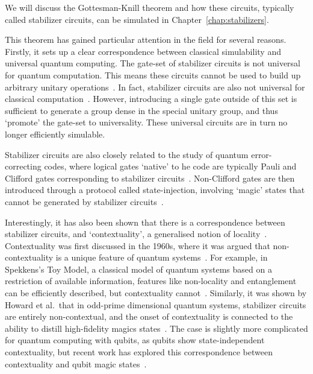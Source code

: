 We will discuss the Gottesman-Knill theorem and how these circuits, typically called stabilizer circuits, can be simulated in Chapter~\ref{chap:stabilizers}.\par
This theorem has gained particular attention in the field for several reasons. Firstly, it sets up a clear correspondence between classical simulability and universal quantum computing. The gate-set of stabilizer circuits is not universal for quantum computation. This means these circuits cannot be used to build up arbitrary unitary operations~\cite{Nielsen2000}. In fact, stabilizer circuits are also not universal for classical computation~\cite{Aaronson2004}. However, introducing a single gate outside of this set is sufficient to generate a group dense in the special unitary group, and thus `promote' the gate-set to universality. These universal circuits are in turn no longer efficiently simulable.\par
Stabilizer circuits are also closely related to the study of quantum error-correcting codes, where logical gates `native' to he code are typically Pauli and Clifford gates corresponding to stabilizer circuits~\cite{Nielsen2000}. Non-Clifford gates are then introduced through a protocol called state-injection, involving `magic' states that cannot be generated by stabilizer circuits~\cite{Gottesman1999,Bravyi2005}.\par
Interestingly, it has also been shown that there is a correspondence between stabilizer circuits, and `contextuality', a generalised notion of locality~\cite{Howard2014}. Contextuality was first discussed in the 1960s, where it was argued that non-contextuality is a unique feature of quantum systems~\cite{Bell1966,Kochen1967}. For example, in Spekkens's Toy Model, a classical model of quantum systems based on a restriction of available information, features like non-locality and entanglement can be efficiently described, but contextuality cannot~\cite{Kochen1967}. Similarly, it was shown by Howard et al.\ that in odd-prime dimensional quantum systems, stabilizer circuits are entirely non-contextual, and the onset of contextuality is connected to the ability to distill high-fidelity magics states~\cite{Howard2014}. The case is slightly more complicated for quantum computing with qubits, as qubits show state-independent contextuality, but recent work has explored this correspondence between contextuality and qubit magic states~\cite{BermejoVega2017}.
